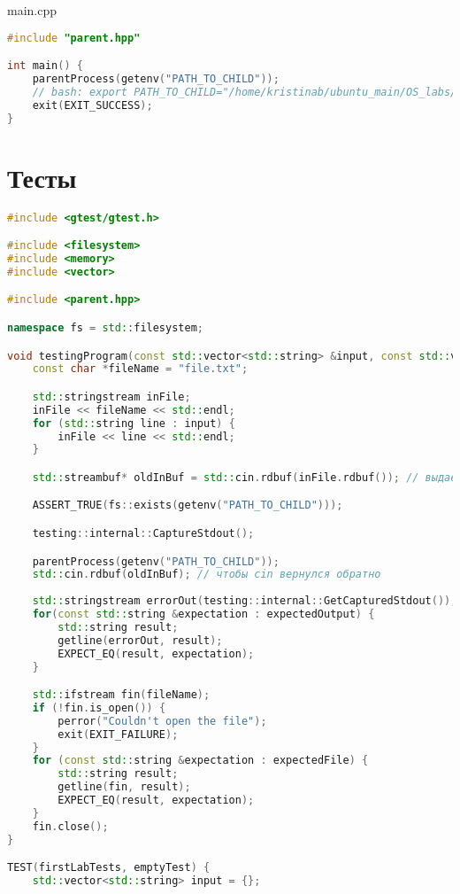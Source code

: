 \documentclass[a4paper, 12pt]{article}
\begin{document}
main.cpp
\begin{lstlisting}[language=C++]
#include "parent.hpp"

int main() {
    parentProcess(getenv("PATH_TO_CHILD"));
    // bash: export PATH_TO_CHILD="/home/kristinab/ubuntu_main/OS_labs/build/lab1/child"
    exit(EXIT_SUCCESS);
}
\end{lstlisting}

\newpage
\section{Тесты}

\begin{lstlisting}[language=C++]
#include <gtest/gtest.h>

#include <filesystem>
#include <memory>
#include <vector>

#include <parent.hpp>

namespace fs = std::filesystem;

void testingProgram(const std::vector<std::string> &input, const std::vector<std::string> &expectedOutput, const std::vector<std::string> &expectedFile) {
    const char *fileName = "file.txt";

    std::stringstream inFile;
    inFile << fileName << std::endl;
    for (std::string line : input) {
        inFile << line << std::endl;
    }

    std::streambuf* oldInBuf = std::cin.rdbuf(inFile.rdbuf()); // выдает старый буфер

    ASSERT_TRUE(fs::exists(getenv("PATH_TO_CHILD")));

    testing::internal::CaptureStdout();

    parentProcess(getenv("PATH_TO_CHILD"));
    std::cin.rdbuf(oldInBuf); // чтобы cin вернулся обратно
    
    std::stringstream errorOut(testing::internal::GetCapturedStdout());
    for(const std::string &expectation : expectedOutput) {
        std::string result;
        getline(errorOut, result);
        EXPECT_EQ(result, expectation);
    }

    std::ifstream fin(fileName);
    if (!fin.is_open()) {
        perror("Couldn't open the file");
        exit(EXIT_FAILURE);
    }
    for (const std::string &expectation : expectedFile) {
        std::string result;
        getline(fin, result);
        EXPECT_EQ(result, expectation);
    }
    fin.close();
}

TEST(firstLabTests, emptyTest) {
    std::vector<std::string> input = {};


\end{lstlisting}
\end{document}

